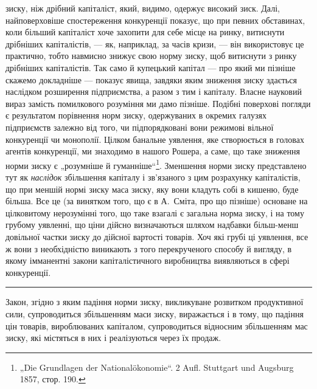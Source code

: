 \parcont{}  %
зиску, ніж дрібний капіталіст, який, видимо, одержує високий зиск. Далі, найповерховіше
спостереження конкуренції показує, що при певних обставинах, коли більший капіталіст хоче захопити
для себе місце на ринку, витиснути дрібніших капіталістів, — як, наприклад, за часів кризи, — він
використовує це практично, тобто навмисно знижує свою норму зиску, щоб витиснути з ринку дрібніших
капіталістів. Так само й купецький капітал — про який ми пізніше скажемо докладніше — показує явища,
завдяки яким зниження зиску здається наслідком розширення підприємства, а разом з тим і капіталу.
Власне науковий вираз замість помилкового розуміння ми дамо пізніше. Подібні поверхові погляди є
результатом порівнення норм зиску, одержуваних в окремих галузях підприємств залежно від того, чи
підпорядковані вони режимові вільної конкуренції чи монополії. Цілком банальне уявлення, яке
створюється в головах агентів конкуренції, ми знаходимо в нашого Рошера, а саме, що таке зниження
норми зиску є „розумніше й гуманніше“\footnote*{
„Die Grundlagen der Nationalökonomie“. 2 Aufl. Stuttgart und Augsburg 1857,
стор. 190. 
}. Зменшення норми зиску представлено тут як \emph{наслідок}
збільшення капіталу і зв’язаного з цим розрахунку капіталістів, що при меншій нормі зиску маса
зиску, яку вони кладуть собі в кишеню, буде більша. Все це (за винятком того, що є в А.~Сміта, про
що пізніше) основане на цілковитому нерозумінні того, що таке взагалі є загальна норма зиску, і на
тому грубому уявленні, що ціни дійсно визначаються шляхом надбавки більш-менш довільної частки зиску
до дійсної вартості товарів. Хоч які грубі ці уявлення, все ж вони з необхідністю виникають з того
перекрученого способу й вигляду, в якому імманентні закони капіталістичного виробництва виявляються
в сфері конкуренції.

\pfbreak{}

Закон, згідно з яким падіння норми зиску, викликуване розвитком продуктивної сили, супроводиться
збільшенням маси зиску, виражається і в тому, що падіння цін товарів, вироблюваних капіталом,
супроводиться відносним збільшенням мас зиску, які містяться в них і реалізуються через їх продаж.

